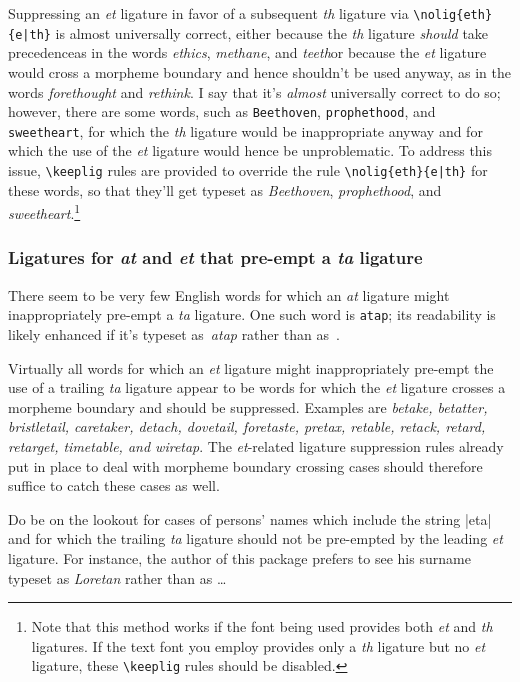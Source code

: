 \documentclass[11pt]{article}
\newcommand{\opt}[1]{\texttt{#1}}
\newcommand{\cmmd}[1]{\texttt{\textbackslash #1}}
\begin{document}
Suppressing an \emph{et} ligature in favor of a subsequent \emph{th} ligature via \Verb+\nolig{eth}{e|th}+ is almost universally correct, either because the \emph{th} ligature \emph{should} take precedence\textemdash as in the words \emph{ethics}, \emph{methane}, and \emph{teeth}\textemdash or because the \emph{et} ligature would cross a morpheme boundary and hence shouldn't be used anyway, as in the words \emph{forethought} and \emph{rethink}. 
I say that it's \emph{almost} universally correct to do so; however, there are some words, such as \opt{Beethoven}, \opt{prophethood}, and \opt{sweetheart}, for which the \emph{th} ligature would be inappropriate anyway and for which the use of the \emph{et} ligature would hence be unproblematic. To address this issue, \cmmd{keeplig} rules are provided to override the rule \Verb+\nolig{eth}{e|th}+ for these words, so that they'll get typeset as \emph{Beethoven}, \emph{prophethood}, and \emph{sweetheart}.\footnote{Note that this method works if the font being used provides both \emph{et} and \emph{th} ligatures. If the text font you employ provides only a \emph{th} ligature but no \emph{et} ligature, these \cmmd{keeplig} rules should be disabled.}


\subsubsection*{Ligatures for \emph{at} and \emph{et} that pre-empt a \emph{ta} ligature}

There seem to be very few English words for which an \emph{at} ligature might inappropriately pre-empt a \emph{ta} ligature. One such word is \opt{atap}; its readability is likely enhanced if it's typeset as~\emph{atap} rather than as~\emph{}.

Virtually all words for which an \emph{et} ligature might inappropriately pre-empt the use of a trailing \emph{ta} ligature appear to be words for which the \emph{et} ligature crosses a morpheme boundary and should be suppressed. Examples are \emph{betake, betatter, bristletail, caretaker, detach, dovetail, foretaste, pretax, retable, retack, retard, retarget, timetable, \emph{and} wiretap}. The \emph{et}-related ligature suppression rules already put in place to deal with morpheme boundary crossing cases should therefore suffice to catch these cases as well. 

Do be on the lookout for cases of persons' names which include the string |eta| and for which the trailing \emph{ta} ligature should not be pre-empted by the leading \emph{et} ligature. For instance, the author of this package prefers to see his surname typeset as \emph{Loretan} rather than as \emph{}\dots
\end{document}
